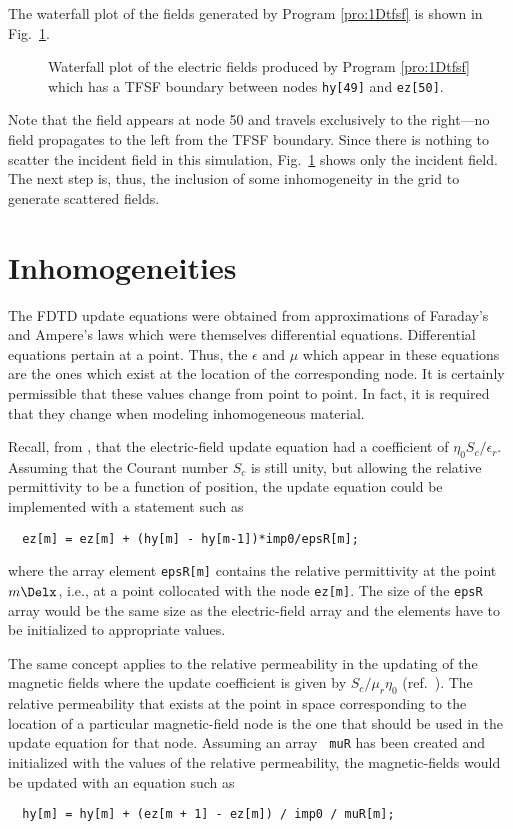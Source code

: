 The waterfall plot of the fields generated by Program \ref{pro:1Dtfsf}
is shown in Fig.\ \ref{fig:waterfallTFSF}.  
\begin{figure}
  \begin{center}
  \end{center}
  \caption{Waterfall plot of the electric fields produced by
    Program \ref{pro:1Dtfsf} which has a TFSF boundary between nodes
    {\tt hy[49]} and {\tt ez[50]}.}
  \label{fig:waterfallTFSF}
\end{figure}
Note that the field appears at node 50 and travels exclusively to the
right---no field propagates to the left from the TFSF boundary.  Since
there is nothing to scatter the incident field in this simulation,
Fig.\ \ref{fig:waterfallTFSF} shows only the incident field.  The next
step is, thus, the inclusion of some inhomogeneity in the grid to
generate scattered fields.


\section{Inhomogeneities \label{sec:gridInhomogeneities}}

The FDTD update equations were obtained from approximations of
Faraday's and Ampere's laws which were themselves differential
equations.  Differential equations pertain at a point.  Thus, the
$\epsilon$ and $\mu$ which appear in these equations are the ones
which exist at the location of the corresponding node.  It is
certainly permissible that these values change from point to point.
In fact, it is required that they change when modeling inhomogeneous
material.

Recall, from , that the electric-field update
equation had a coefficient of $\eta_0 S_c/\epsilon_r$.  Assuming that
the Courant number $S_c$ is still unity, but allowing the relative
permittivity to be a function of position, the update equation could
be implemented with a statement such as
\begin{verbatim}
  ez[m] = ez[m] + (hy[m] - hy[m-1])*imp0/epsR[m];
\end{verbatim}
where the array element {\tt epsR[m]} contains the relative
permittivity at the point $m\Delx$, i.e., at a point collocated with
the node {\tt ez[m]}.  The size of the {\tt epsR} array would be the
same size as the electric-field array and the elements have to be
initialized to appropriate values.

The same concept applies to the relative permeability in the updating
of the magnetic fields where the update coefficient is given by
$S_c/\mu_r\eta_0$ (ref.\ ).  The relative
permeability that exists at the point in space corresponding to the
location of a particular magnetic-field node is the one that should be
used in the update equation for that node.  Assuming an array {\tt
muR} has been created and initialized with the values of the relative
permeability, the magnetic-fields would be updated with an equation
such as
\begin{verbatim}
  hy[m] = hy[m] + (ez[m + 1] - ez[m]) / imp0 / muR[m];
\end{verbatim}

